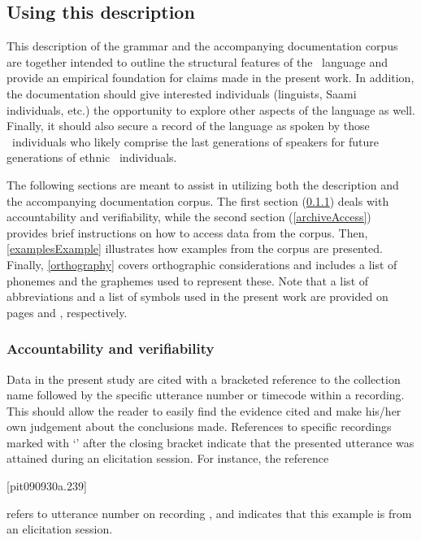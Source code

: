 

\subsection{Using this description}\label{usingThis}  
This description of the grammar and the accompanying documentation corpus are together intended to outline the structural features of the \PS\ language and provide an empirical foundation for claims made in the present work. In addition, the documentation should give interested individuals (linguists, Saami individuals, etc.) the opportunity to explore other aspects of the language as well. Finally, it should also secure a record of the language as spoken by those \PS\ individuals who likely comprise the last generations of speakers for future generations of ethnic \PS\ individuals. 

The following sections are meant to assist in utilizing both the description and the accompanying documentation corpus. 
The first section (\SEC\ref{accountabilityEtc}) deals with accountability and verifiability, while the second section (\SEC\ref{archiveAccess}) provides brief instructions on how to access data from the corpus. 
Then, \SEC\ref{examplesExample} illustrates how examples from the corpus are presented. %
Finally, \SEC\ref{orthography} covers orthographic considerations and includes a list of phonemes and the graphemes used to represent these. 
Note that a list of abbreviations and a list of symbols used in the present work are provided on pages \pageref{abbreviations} and \pageref{symbolList}, respectively. 


\subsubsection{Accountability and verifiability}\label{accountabilityEtc}
Data in the present study are cited with a bracketed reference to the collection name followed by the specific utterance number or timecode within a recording. 
This should allow the reader to easily find the evidence cited and make his/her own judgement about the conclusions made. References to specific recordings marked with ‘’ after the closing bracket indicate that the presented utterance was attained during an elicitation session. 
For instance, the reference 
\begin{center}\small[pit090930a.239]\end{center}
refers to utterance number  on recording , and indicates that this example is from an elicitation session. %

